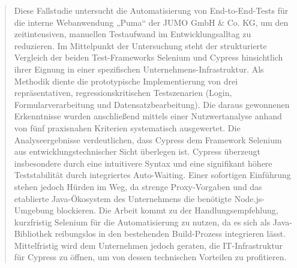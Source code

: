 \begin{abstract}
\justifying %
\noindent

Diese Fallstudie untersucht die Automatisierung von End-to-End-Tests für die interne Webanwendung „Puma“ der JUMO GmbH \& Co. KG, um den zeitintensiven, manuellen Testaufwand im Entwicklungsalltag zu reduzieren. 
Im Mittelpunkt der Untersuchung steht der strukturierte Vergleich der beiden Test-Frameworks Selenium und Cypress hinsichtlich ihrer Eignung in einer spezifischen Unternehmens-Infrastruktur.  
Als Methodik diente die prototypische Implementierung von drei repräsentativen, regressionskritischen Testszenarien (Login, Formularverarbeitung und Datensatzbearbeitung). 
Die daraus gewonnenen Erkenntnisse wurden anschließend mittels einer Nutzwertanalyse anhand von fünf praxisnahen Kriterien systematisch ausgewertet.  
Die Analyseergebnisse verdeutlichen, dass Cypress dem Framework Selenium aus entwicklungstechnischer Sicht überlegen ist. 
Cypress überzeugt insbesondere durch eine intuitivere Syntax und eine signifikant höhere Teststabilität durch integriertes Auto-Waiting. 
Einer sofortigen Einführung stehen jedoch Hürden im Weg, da strenge Proxy-Vorgaben und das etablierte Java-Ökosystem des Unternehmens die benötigte Node.js-Umgebung blockieren.  
Die Arbeit kommt zu der Handlungsempfehlung, kurzfristig Selenium für die Automatisierung zu nutzen, da es sich als Java-Bibliothek reibungslos in den bestehenden Build-Prozess integrieren lässt. Mittelfristig wird dem Unternehmen jedoch geraten, die IT-Infrastruktur für Cypress zu öffnen, um von dessen technischen Vorteilen zu profitieren.
\end{abstract}

